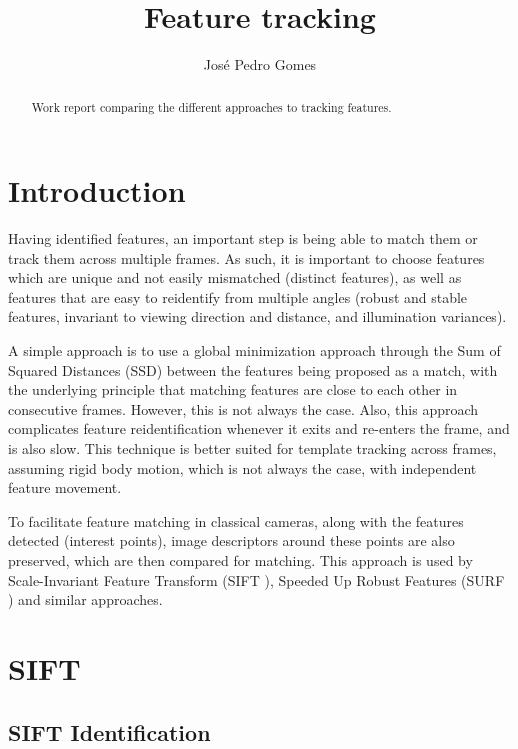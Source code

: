 \documentclass[10pt,onecolumn]{IEEEtran}
\begin{document}
\title{Feature tracking}
\author{Jos\'e Pedro Gomes}

\maketitle

\begin{abstract}

Work report comparing the different approaches to tracking features.

\end{abstract}
 
\section{Introduction}

Having identified features, an important step is being able to match them or track them across multiple frames. As such, it is important to choose features which are unique and not easily mismatched (distinct features), as well as features that are easy to reidentify from multiple angles (robust and stable features, invariant to viewing direction and distance, and illumination variances).

A simple approach is to use a global minimization approach through the Sum of Squared Distances (SSD) between the features being proposed as a match, with the underlying principle that matching features are close to each other in consecutive frames. However, this is not always the case. Also, this approach complicates feature reidentification whenever it exits and re-enters the frame, and is also slow. This technique is better suited for template tracking across frames, assuming rigid body motion, which is not always the case, with independent feature movement.

To facilitate feature matching in classical cameras, along with the features detected (interest points), image descriptors around these points are also preserved, which are then compared for matching. This approach is used by Scale-Invariant Feature Transform (SIFT \cite{lowe1999object}), Speeded Up Robust Features (SURF \cite{bay2006surf}) and similar approaches.

\section{SIFT}



\subsection{SIFT Identification}
\end{document}
